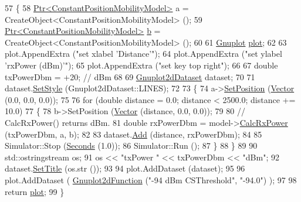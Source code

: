 \begin{DoxyCode}
57 \{
58   \hyperlink{classns3_1_1Ptr}{Ptr<ConstantPositionMobilityModel>} a = 
      CreateObject<ConstantPositionMobilityModel> ();
59   \hyperlink{classns3_1_1Ptr}{Ptr<ConstantPositionMobilityModel>} \hyperlink{buildings__pathloss_8m_a21ad0bd836b90d08f4cf640b4c298e7c}{b} = 
      CreateObject<ConstantPositionMobilityModel> ();
60 
61   \hyperlink{classns3_1_1Gnuplot}{Gnuplot} \hyperlink{lte__amc_8m_a5942306abe9f005572e4344e3cdef528}{plot};
62 
63   plot.AppendExtra (\textcolor{stringliteral}{"set xlabel 'Distance'"});
64   plot.AppendExtra (\textcolor{stringliteral}{"set ylabel 'rxPower (dBm)'"});
65   plot.AppendExtra (\textcolor{stringliteral}{"set key top right"});
66 
67   \textcolor{keywordtype}{double} txPowerDbm = +20; \textcolor{comment}{// dBm}
68 
69   \hyperlink{classns3_1_1Gnuplot2dDataset}{Gnuplot2dDataset} dataset;
70 
71   dataset.\hyperlink{classns3_1_1Gnuplot2dDataset_a7a3d6b6c2bd7d32a82f5715bae37c886}{SetStyle} (Gnuplot2dDataset::LINES);
72 
73   \{
74     a->\hyperlink{classns3_1_1MobilityModel_ac584b3d5a309709d2f13ed6ada1e7640}{SetPosition} (\hyperlink{classns3_1_1Vector3D_a7e59b47bc94c9cb1dadff68c1d0112d8}{Vector} (0.0, 0.0, 0.0));
75 
76     \textcolor{keywordflow}{for} (\textcolor{keywordtype}{double} distance = 0.0; distance < 2500.0; distance += 10.0)
77       \{
78         b->SetPosition (\hyperlink{classns3_1_1Vector3D_a7e59b47bc94c9cb1dadff68c1d0112d8}{Vector} (distance, 0.0, 0.0));
79 
80         \textcolor{comment}{// CalcRxPower() returns dBm.}
81         \textcolor{keywordtype}{double} rxPowerDbm = model->\hyperlink{classns3_1_1PropagationLossModel_a8b42564e9b03e2197f17aab6692c4fee}{CalcRxPower} (txPowerDbm, a, b);
82 
83         dataset.\hyperlink{classns3_1_1Gnuplot2dDataset_abd93f7c8fa2d1ed643c09d7fb8d5ef27}{Add} (distance, rxPowerDbm);
84 
85         Simulator::Stop (\hyperlink{group__timecivil_ga33c34b816f8ff6628e33d5c8e9713b9e}{Seconds} (1.0));
86         Simulator::Run ();
87       \}
88   \}
89 
90   std::ostringstream os;
91   os << \textcolor{stringliteral}{"txPower "} << txPowerDbm << \textcolor{stringliteral}{"dBm"};
92   dataset.\hyperlink{classns3_1_1GnuplotDataset_add68db1296fcadff7255633c0df96e08}{SetTitle} (os.str ());
93 
94   plot.AddDataset (dataset);
95 
96   plot.AddDataset ( \hyperlink{classns3_1_1Gnuplot2dFunction}{Gnuplot2dFunction} (\textcolor{stringliteral}{"-94 dBm CSThreshold"}, \textcolor{stringliteral}{"-94.0"}) );
97 
98   \textcolor{keywordflow}{return} \hyperlink{lte__amc_8m_a5942306abe9f005572e4344e3cdef528}{plot};
99 \}
\end{DoxyCode}


